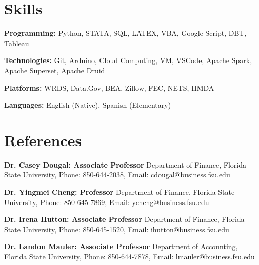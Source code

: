 \documentclass[letterpaper,11pt]{article}
\newcommand{\resumeSubHeadingListStart}{\begin{itemize}[leftmargin=0.15in, label={}]}
\newcommand{\resumeSubHeadingListEnd}{\end{itemize}}
\begin{document}
\section{Skills}
  \vspace{2pt}
  \resumeSubHeadingListStart
    \small{\item{
        \textbf{Programming:}{ Python, STATA, SQL, LATEX, VBA, Google Script, DBT, Tableau} \\ \vspace{3pt}
        
        \textbf{Technologies:}{ Git, Arduino, Cloud Computing, VM, VSCode, Apache Spark, Apache Superset, Apache Druid} \\ \vspace{3pt}

        \textbf{Platforms:}{ WRDS, Data.Gov, BEA, Zillow, FEC, NETS, HMDA} \\ \vspace{3pt}
        
        \textbf{Languages:}{ English (Native), Spanish (Elementary)}
        
    }}
  \resumeSubHeadingListEnd




\section{References}
  \vspace{2pt}
  \resumeSubHeadingListStart
    \small{\item{
        \textbf{Dr. Casey Dougal: Associate Professor}{ Department of Finance, Florida State University, Phone: 850-644-2038, Email: cdougal@business.fsu.edu} \\ \vspace{3pt}

        \textbf{Dr. Yingmei Cheng: Professor}{ Department of Finance, Florida State University, Phone: 850-645-7869, Email:  ycheng@business.fsu.edu} \\ \vspace{3pt}

        \textbf{Dr. Irena Hutton: Associate Professor}{ Department of Finance, Florida State University, Phone: 850-645-1520, Email: ihutton@business.fsu.edu} \\ \vspace{3pt}

        \textbf{Dr. Landon Mauler: Associate Professor}{ Department of Accounting, Florida State University, Phone: 850-644-7878, Email: lmauler@business.fsu.edu} \\ \vspace{3pt}
    }}
  \resumeSubHeadingListEnd
\end{document}
